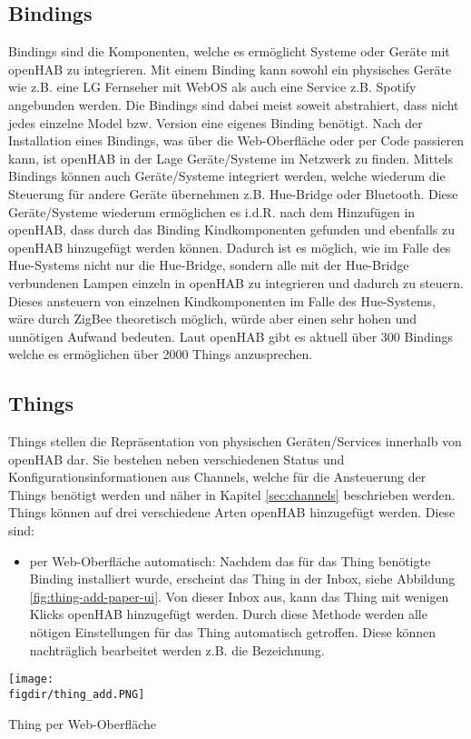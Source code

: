 \subsection{Bindings} \label{sec:Bindings}
Bindings sind die Komponenten, welche es ermöglicht Systeme oder Geräte mit openHAB zu integrieren. Mit einem Binding kann sowohl ein physisches Geräte wie z.B. eine LG Fernseher mit WebOS als auch eine Service z.B. Spotify angebunden werden. Die Bindings sind dabei meist soweit abstrahiert, dass nicht jedes einzelne Model bzw. Version eine eigenes Binding benötigt.
Nach der Installation eines Bindings, was über die Web-Oberfläche oder per Code passieren kann, ist openHAB in der Lage Geräte/Systeme im Netzwerk zu finden. Mittels Bindings können auch Geräte/Systeme integriert werden, welche wiederum die Steuerung für andere Geräte übernehmen z.B. Hue-Bridge oder Bluetooth. Diese Geräte/Systeme wiederum ermöglichen es i.d.R. nach dem Hinzufügen in openHAB, dass durch das Binding Kindkomponenten gefunden und ebenfalls zu openHAB hinzugefügt werden können. Dadurch ist es möglich, wie im Falle des Hue-Systems nicht nur die Hue-Bridge, sondern alle mit der Hue-Bridge verbundenen Lampen einzeln in openHAB zu integrieren und dadurch zu steuern. Dieses ansteuern von einzelnen Kindkomponenten im Falle des Hue-Systems, wäre durch ZigBee theoretisch möglich, würde aber einen sehr hohen und unnötigen Aufwand bedeuten. 
Laut openHAB gibt es aktuell über 300 Bindings welche es ermöglichen über 2000 Things anzusprechen.

\subsection{Things}
Things stellen die Repräsentation von physischen Geräten/Services innerhalb von openHAB dar. Sie bestehen neben verschiedenen Status und Konfigurationsinformationen aus Channels, welche für die Ansteuerung der Things benötigt werden und näher in Kapitel \ref{sec:channels} beschrieben werden.
Things können auf drei verschiedene Arten openHAB hinzugefügt werden. Diese sind:
\begin{itemize}
	\item per Web-Oberfläche automatisch: Nachdem das für das Thing benötigte Binding installiert wurde, erscheint das Thing in der Inbox, siehe Abbildung \ref{fig:thing-add-paper-ui}. Von dieser Inbox aus, kann das Thing mit wenigen Klicks openHAB hinzugefügt werden. Durch diese Methode werden alle nötigen Einstellungen für das Thing automatisch getroffen. Diese können nachträglich bearbeitet werden z.B. die Bezeichnung. 
\end{itemize}
\centering
\captionsetup{type=figure}
\texttt{[image: \\figdir/thing\_add.PNG]}
\caption{Thing per Web-Oberfläche \label{fig:thing-add-paper-ui}}
	
